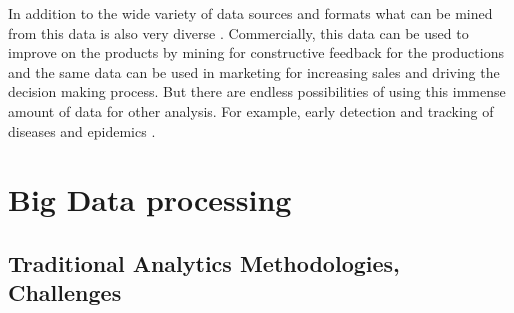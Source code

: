 \documentclass[sigconf]{acmart}
\begin{document}
In addition to the wide variety of data sources and formats what can be mined from this data is also very diverse \cite{ncsupost} \cite{KaplanChallengesSM}. Commercially, this data can be used to improve on the products by mining for constructive feedback for the productions and the same data can be used in marketing for increasing sales and driving the decision making process. But there are endless possibilities of using this immense amount of data for other analysis. For example, early detection and tracking of diseases and epidemics \cite{detectingoutbreaks}.

\section{Big Data processing}
\subsection{Traditional Analytics Methodologies, Challenges}
\end{document}
